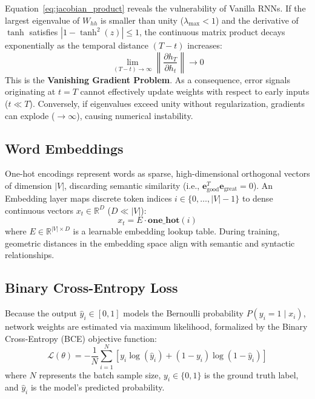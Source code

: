 \documentclass[11pt,a4paper]{article}
\begin{document}
Equation~\eqref{eq:jacobian_product} reveals the vulnerability of Vanilla RNNs. If the largest eigenvalue of $W_{hh}$ is smaller than unity ($\lambda_{\max} < 1$) and the derivative of $\tanh$ satisfies $|1 - \tanh^2(z)| \le 1$, the continuous matrix product decays exponentially as the temporal distance $(T - t)$ increases:
\begin{equation}
\lim_{(T - t) \to \infty} \left\| \frac{\partial h_T}{\partial h_t} \right\| \to 0
\end{equation}
This is the \textbf{Vanishing Gradient Problem}. As a consequence, error signals originating at $t = T$ cannot effectively update weights with respect to early inputs ($t \ll T$). Conversely, if eigenvalues exceed unity without regularization, gradients can explode ($\to \infty$), causing numerical instability.

\subsection{Word Embeddings}
One-hot encodings represent words as sparse, high-dimensional orthogonal vectors of dimension $|V|$, discarding semantic similarity (i.e., $\mathbf{e}_{\text{good}}^T \mathbf{e}_{\text{great}} = 0$). An Embedding layer maps discrete token indices $i \in \{0, \dots, |V|-1\}$ to dense continuous vectors $x_t \in \mathbb{R}^D$ ($D \ll |V|$):
\begin{equation}
x_t = E \cdot \mathbf{one\_hot}(i)
\end{equation}
where $E \in \mathbb{R}^{|V| \times D}$ is a learnable embedding lookup table. During training, geometric distances in the embedding space align with semantic and syntactic relationships.

\subsection{Binary Cross-Entropy Loss}
Because the output $\hat{y}_i \in [0, 1]$ models the Bernoulli probability $P(y_i = 1 \mid x_i)$, network weights are estimated via maximum likelihood, formalized by the Binary Cross-Entropy (BCE) objective function:
\begin{equation}
\mathcal{L}(\theta) = -\frac{1}{N}\sum_{i=1}^{N} \left[ y_i \log(\hat{y}_i) + (1 - y_i)\log(1 - \hat{y}_i) \right]
\label{eq:bce_loss}
\end{equation}
where $N$ represents the batch sample size, $y_i \in \{0, 1\}$ is the ground truth label, and $\hat{y}_i$ is the model's predicted probability.
\end{document}
